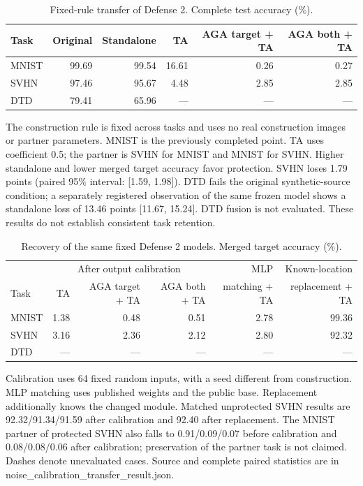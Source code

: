 \begin{table}[t]
\centering\small
\caption{Fixed-rule transfer of Defense 2. Complete test accuracy (\%).}
\label{tab:noise-calibration-transfer}
\begin{tabular}{lrrrrr}
\toprule
Task & Original & Standalone & TA & AGA target + TA & AGA both + TA \\
\midrule
MNIST & 99.69 & 99.54 & 16.61 & 0.26 & 0.27 \\
SVHN & 97.46 & 95.67 & 4.48 & 2.85 & 2.85 \\
DTD & 79.41 & 65.96 & --- & --- & --- \\
\bottomrule
\end{tabular}
\par\smallskip
\begin{minipage}{\textwidth}\footnotesize
The construction rule is fixed across tasks and uses no real construction images or partner parameters. MNIST is the previously completed point. TA uses coefficient 0.5; the partner is SVHN for MNIST and MNIST for SVHN. Higher standalone and lower merged target accuracy favor protection. SVHN loses 1.79 points (paired 95\% interval: [1.59, 1.98]). DTD fails the original synthetic-source condition; a separately registered observation of the same frozen model shows a standalone loss of 13.46 points [11.67, 15.24]. DTD fusion is not evaluated. These results do not establish consistent task retention.
\end{minipage}
\end{table}

\begin{table}[t]
\centering\small
\caption{Recovery of the same fixed Defense 2 models. Merged target accuracy (\%).}
\label{tab:noise-calibration-transfer-recovery}
\begin{tabular}{lrrrrr}
\toprule
& \multicolumn{3}{c}{After output calibration} & MLP & Known-location \\
Task & TA & AGA target + TA & AGA both + TA & matching + TA & replacement + TA \\
\midrule
MNIST & 1.38 & 0.48 & 0.51 & 2.78 & 99.36 \\
SVHN & 3.16 & 2.36 & 2.12 & 2.80 & 92.32 \\
DTD & --- & --- & --- & --- & --- \\
\bottomrule
\end{tabular}
\par\smallskip
\begin{minipage}{\textwidth}\footnotesize
Calibration uses 64 fixed random inputs, with a seed different from construction. MLP matching uses published weights and the public base. Replacement additionally knows the changed module. Matched unprotected SVHN results are 92.32/91.34/91.59 after calibration and 92.40 after replacement. The MNIST partner of protected SVHN also falls to 0.91/0.09/0.07 before calibration and 0.08/0.08/0.06 after calibration; preservation of the partner task is not claimed. Dashes denote unevaluated cases. Source and complete paired statistics are in noise\_calibration\_transfer\_result.json.
\end{minipage}
\end{table}


